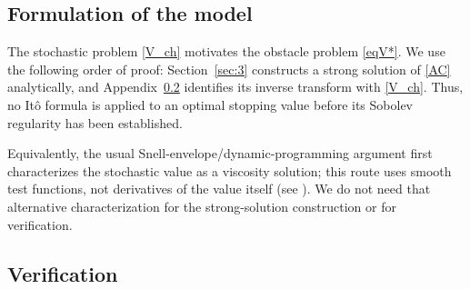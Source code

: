 \documentclass[11pt, a4paper, leqno]{amsart}
\numberwithin{equation}{section}
\theoremstyle{plain}
\theoremstyle{definition}
\theoremstyle{remark}
\begin{document}
\renewcommand{\thesubsection}{\Alph{subsection}}
\setcounter{subsection}{0}
\renewcommand{\theHsubsection}{appendix.\Alph{subsection}}
\renewcommand{\theequation}{\thesubsection.\arabic{equation}}
\renewcommand{\theHequation}{appendix.\thesubsection.\arabic{equation}}

\subsection{Formulation of the model}\label{Appendix.A}

{
The stochastic problem \eqref{V_ch} motivates the obstacle problem
\eqref{eqV*}. We use the following order of proof: Section~\ref{sec:3}
constructs a strong solution of \eqref{AC} analytically, and
Appendix~\ref{Appendix.B} identifies its inverse transform with
\eqref{V_ch}. Thus, no It\^o formula is applied to an optimal stopping
value before its Sobolev regularity has been established.

Equivalently, the usual Snell-envelope/dynamic-programming argument first
characterizes the stochastic value as a viscosity solution; this route
uses smooth test functions, not derivatives of the value itself
(see \cite{PAS11,Rapuch2005}). We do not need that alternative
characterization for the strong-solution construction or for verification.
}

\subsection{Verification}\label{Appendix.B}
\end{document}

